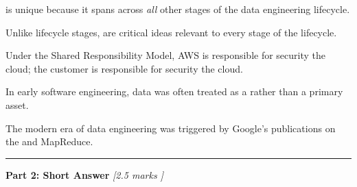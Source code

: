 \documentclass[12pt,addpoints]{exam}
\begin{document}
\vspace{2pt}
\begin{questions}



\question[\half] \underline{\hspace{2.8cm}} is unique because it spans across \emph{all} other stages of the data engineering lifecycle.

\question[\half] Unlike lifecycle stages, \underline{\hspace{2.8cm}} are critical ideas relevant to every stage of the lifecycle.


\question[\half] Under the Shared Responsibility Model, AWS is responsible for security \underline{\hspace{1.2cm}} the cloud; the customer is responsible for security \underline{\hspace{1.2cm}} the cloud.

\question[\half] In early software engineering, data was often treated as a \underline{\hspace{2.8cm}} rather than a primary asset.



\question[\half] The modern era of data engineering was triggered by Google's publications on the \underline{\hspace{3.5cm}} and MapReduce.

\end{questions}

\rule[1ex]{\textwidth}{0.8pt}

\noindent\textbf{Part 2: Short Answer} \hfill \textit{[2.5 marks ]}
\end{document}

